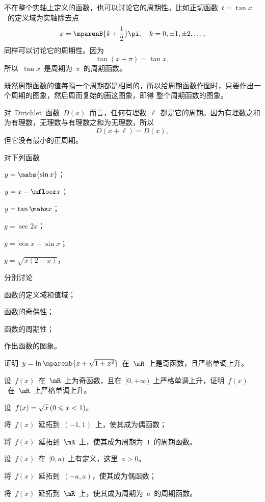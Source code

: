 不在整个实轴上定义的函数，也可以讨论它的周期性。比如正切函数~$t=\tan x$~的定义域为实轴除去点
\[
  x=\mparenB{k+\frac12}\pi\mcond*{k=0,\pm1,\pm2,\dotsc},
\]
同样可以讨论它的周期性。因为
\[
  \tan(x+\pi)=\tan x,
\]
所以~$\tan x$~是周期为~$\pi$~的周期函数。

既然周期函数的值每隔一个周期都是相同的，所以给周期函数作图时，只要作出一个周期的图象，然后周而复始的画这图象，即得
整个周期函数的图象。

对~Dirichlet~函数~$D(x)$~而言，任何有理数~$\ell$~都是它的周期。因为有理数之和为有理数，无理数与有理数之和为无理数，所以
\[
  D(x+\ell)=D(x),
\]
但它没有最小的正周期。

\begin{exercise}
\item 对下列函数
\begin{exlistcols}[3]
  \item $y=\mabs{\sin x}$；
  \item $y=x-\mfloor x$；
  \item $y=\tan\mabs x$；
  \item $y=\sec 2x$；
  \item $y=\cos x+\sin x$；
  \item $y=\sqrt{x(2-x)}$，
\end{exlistcols}
分别讨论
\begin{exlistcols}
  \item 函数的定义域和值域；
  \item 函数的奇偶性；
  \item 函数的周期性；
  \item 作出函数的图象。
\end{exlistcols}
\item 证明~$y=\ln\mparenb{x+\sqrt{1+x^2}}$~在~$\mR$~上是奇函数，且严格单调上升。
\item 设~$f(x)$~在~$\mR$~上为奇函数，且在~$[0,+\infty)$~上严格单调上升，证明~$f(x)$~在~$\mR$~上严格单调上升。
\item 设~$f(x)=\sqrt x\mcond{0\leq x<1}$。
\begin{exlist}
  \item 将~$f(x)$~延拓到~$(-1,1)$~上，使其成为偶函数；
  \item 将~$f(x)$~延拓到~$\mR$~上，使其成为周期为~$1$~的周期函数。
\end{exlist}
\item 设~$f(x)$~在~$[0,a)$~上有定义，这里~$a>0$。
\begin{exlist}
  \item 将~$f(x)$~延拓到~$(-a,a)$，使其成为偶函数；
  \item 将~$f(x)$~延拓到~$\mR$~上，使其成为周期为~$a$~的周期函数。

\end{exlist}
\end{exercise}
